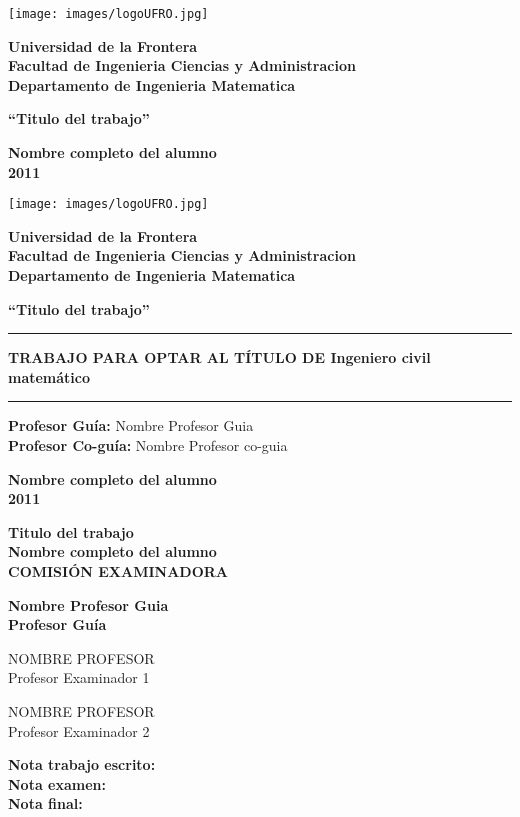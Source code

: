 \documentclass[letterpaper, 12pt]{article}%
\newcommand\universidad{Universidad de la Frontera}
\newcommand\facultad{Facultad de Ingenieria Ciencias y Administracion}
\newcommand\departamento{Departamento de Ingenieria Matematica}
\newcommand\tituloTrabajo{Titulo del trabajo}
\newcommand\nombrecompleto{nombre completo del alumno}
\newcommand\annotrabajo{2011}
\newcommand\titulocarrera{Ingeniero civil matemático}
\newcommand\profesorguia{Nombre Profesor Guia}
\newcommand\profesorcoguia{Nombre Profesor co-guia}
\newcommand\footer{
\begin{minipage}[b]{\textwidth}
\begin{center}
		\textbf{
			\MakeUppercase\nombrecompleto\\
			\annotrabajo
		}
\end{center}
\end{minipage}
}
\newcommand\header{
\begin{minipage}{0.1\textwidth}
\texttt{[image: images/logoUFRO.jpg]}
\end{minipage}
\hfill
\begin{minipage}{0.9\textwidth}
\begin{center}
	\textbf{
		\MakeUppercase\universidad\\
		\MakeUppercase\facultad\\
		\MakeUppercase\departamento
	}
\end{center}	
\end{minipage}
}
\newcommand\boxtitle{
\begin{minipage}{\textwidth}
	\begin{center}
		\textbf{ ``\tituloTrabajo''}
	\end{center}
\end{minipage}
}
\begin{document}



\begin{titlepage}
	\header	
	\vfill
	\boxtitle
	\vfill
	\footer
\end{titlepage}

\newpage

\header
\vfill
\boxtitle
\vfill
\hfill
\begin{minipage}{0.6\textwidth}
\begin{center}
	\rule[0mm]{\textwidth}{1mm}
	\textbf{TRABAJO PARA OPTAR AL TÍTULO \newline
	DE \MakeUppercase\titulocarrera \newline}
	\rule[2mm]{\textwidth}{1mm}
\end{center}
\end{minipage}
\vfill
\begin{minipage}{\textwidth}
\begin{flushright}
\textbf{Profesor Guía:} \profesorguia \\
\textbf{Profesor Co-guía:} \profesorcoguia
\end{flushright}
\end{minipage}
\vfill
\footer


\newpage
\begin{minipage}{\textwidth}
\begin{center}
\textbf{
	\MakeUppercase\tituloTrabajo \\
	\MakeUppercase\nombrecompleto \\
	COMISIÓN EXAMINADORA
}
\end{center}
\end{minipage}
\vfill

\begin{minipage}{\textwidth}
\begin{center}
\textbf{
	\MakeUppercase\profesorguia \\
	Profesor Guía
}
\end{center}
\end{minipage}

\vfill

\begin{minipage}{0.5\textwidth}
\begin{center}
NOMBRE PROFESOR \\
Profesor Examinador 1
\end{center}
\end{minipage}
\hfill
\begin{minipage}{0.5\textwidth}
\begin{center}
NOMBRE PROFESOR \\
Profesor Examinador 2
\end{center}
\end{minipage}

\vfill
\hfill
\begin{minipage}{0.5\textwidth}
\begin{flushleft}
\textbf{ Nota trabajo escrito: \\
	Nota examen: \\
	Nota final: \\
}
\end{flushleft}
\end{minipage}


\end{document}
